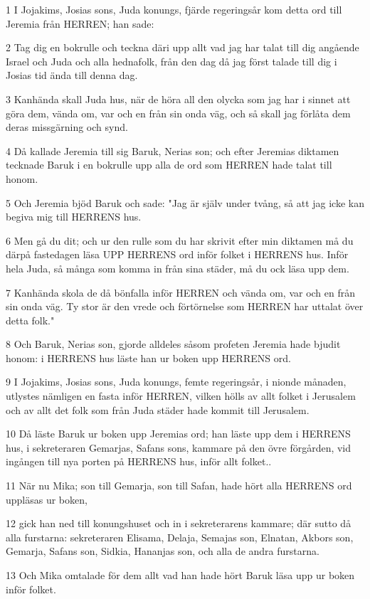 \par 1 I Jojakims, Josias sons, Juda konungs, fjärde regeringsår kom detta ord till Jeremia från HERREN; han sade:
\par 2 Tag dig en bokrulle och teckna däri upp allt vad jag har talat till dig angående Israel och Juda och alla hednafolk, från den dag då jag först talade till dig i Josias tid ända till denna dag.
\par 3 Kanhända skall Juda hus, när de höra all den olycka som jag har i sinnet att göra dem, vända om, var och en från sin onda väg, och så skall jag förlåta dem deras missgärning och synd.
\par 4 Då kallade Jeremia till sig Baruk, Nerias son; och efter Jeremias diktamen tecknade Baruk i en bokrulle upp alla de ord som HERREN hade talat till honom.
\par 5 Och Jeremia bjöd Baruk och sade: "Jag är själv under tvång, så att jag icke kan begiva mig till HERRENS hus.
\par 6 Men gå du dit; och ur den rulle som du har skrivit efter min diktamen må du därpå fastedagen läsa UPP HERRENS ord inför folket i HERRENS hus. Inför hela Juda, så många som komma in från sina städer, må du ock läsa upp dem.
\par 7 Kanhända skola de då bönfalla inför HERREN och vända om, var och en från sin onda väg. Ty stor är den vrede och förtörnelse som HERREN har uttalat över detta folk."
\par 8 Och Baruk, Nerias son, gjorde alldeles såsom profeten Jeremia hade bjudit honom: i HERRENS hus läste han ur boken upp HERRENS ord.
\par 9 I Jojakims, Josias sons, Juda konungs, femte regeringsår, i nionde månaden, utlystes nämligen en fasta inför HERREN, vilken hölls av allt folket i Jerusalem och av allt det folk som från Juda städer hade kommit till Jerusalem.
\par 10 Då läste Baruk ur boken upp Jeremias ord; han läste upp dem i HERRENS hus, i sekreteraren Gemarjas, Safans sons, kammare på den övre förgården, vid ingången till nya porten på HERRENS hus, inför allt folket..
\par 11 När nu Mika; son till Gemarja, son till Safan, hade hört alla HERRENS ord uppläsas ur boken,
\par 12 gick han ned till konungshuset och in i sekreterarens kammare; där sutto då alla furstarna: sekreteraren Elisama, Delaja, Semajas son, Elnatan, Akbors son, Gemarja, Safans son, Sidkia, Hananjas son, och alla de andra furstarna.
\par 13 Och Mika omtalade för dem allt vad han hade hört Baruk läsa upp ur boken inför folket.
